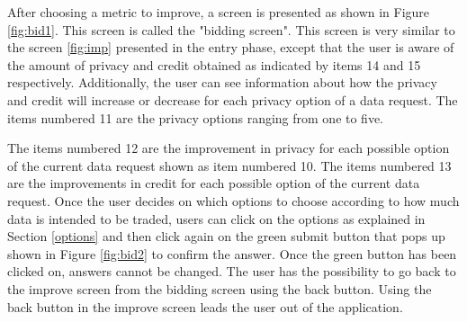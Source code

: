 After choosing a metric to improve, a screen is presented as shown in Figure \ref{fig:bid1}.
This screen is called the "bidding screen". This screen is very similar to the screen \ref{fig:imp} presented in the entry phase, except that the user
is aware of the amount of privacy and credit obtained as indicated by items 14 and 15 respectively. Additionally, the user can see information about how the privacy and credit will increase or decrease for each privacy option of a data request. The items numbered 11 are the privacy options ranging from one to five.

The items numbered 12 are the improvement in privacy for each possible option of the current data request shown as item numbered 10. The items numbered 13 are the improvements in credit for each possible option of the current data request. Once the user decides on which options to choose according to how much data is intended to be traded, users can click on the options as explained in Section \ref{options} and then click again on the green submit button that pops up shown in Figure \ref{fig:bid2} to confirm the answer. Once the green button has been clicked on, answers cannot be changed. The user has the possibility to go back to the improve screen from the bidding screen using the back button. Using the back button in the improve screen leads the user out of the application.

